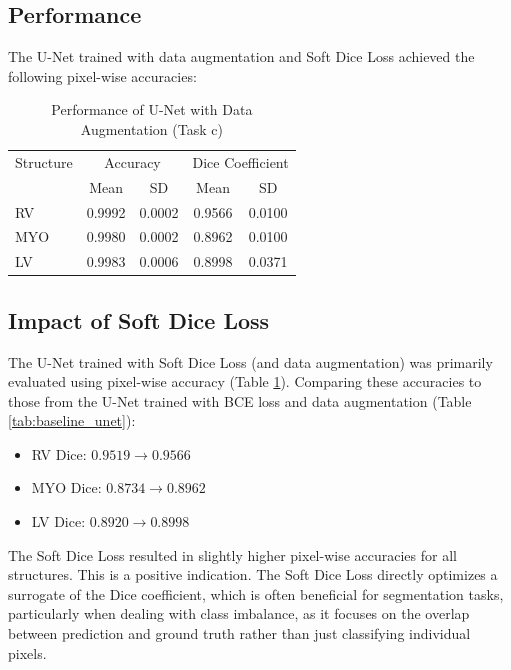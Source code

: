 \documentclass{article}
\begin{document}
\subsection{Performance}
The U-Net trained with data augmentation and Soft Dice Loss achieved the following pixel-wise accuracies:
\begin{table}[H]
  \centering
  \caption{Performance of U-Net with Data Augmentation (Task c)}
  \label{tab:soft_dice_unet}
  \begin{tabular}{l|cc|cc}
    \toprule
    \multicolumn{1}{c|}{Structure} & \multicolumn{2}{c|}{Accuracy} & \multicolumn{2}{c}{Dice Coefficient}                   \\
                                   & Mean                          & SD                                   & Mean   & SD     \\
    \midrule
    RV                             & 0.9992                        & 0.0002                               & 0.9566 & 0.0100 \\
    MYO                            & 0.9980                        & 0.0002                               & 0.8962 & 0.0100 \\
    LV                             & 0.9983                        & 0.0006                               & 0.8998 & 0.0371 \\
    \bottomrule
  \end{tabular}
\end{table}

\subsection{Impact of Soft Dice Loss}
The U-Net trained with Soft Dice Loss (and data augmentation) was primarily evaluated using pixel-wise accuracy
(Table \ref{tab:soft_dice_unet}). Comparing these accuracies to those from the U-Net trained with BCE loss and
data augmentation (Table \ref{tab:baseline_unet}):
\begin{itemize}
  \item RV Dice: $0.9519 \rightarrow 0.9566$
  \item MYO Dice: $0.8734 \rightarrow 0.8962$
  \item LV Dice: $0.8920 \rightarrow 0.8998$
\end{itemize}
The Soft Dice Loss resulted in slightly higher pixel-wise accuracies for all structures. This is a positive indication.
The Soft Dice Loss directly optimizes a surrogate of the Dice coefficient, which is often beneficial for segmentation tasks,
particularly when dealing with class imbalance, as it focuses on the overlap between prediction and ground truth rather
than just classifying individual pixels.
\end{document}
